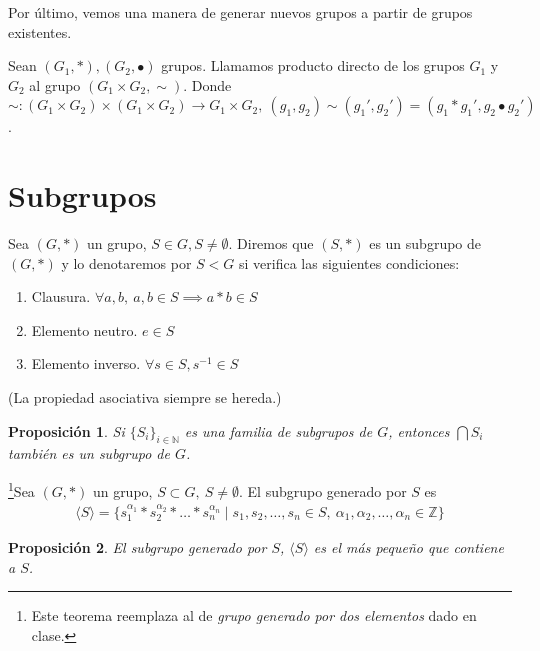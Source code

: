 \documentclass{book}
\newtheorem{pro}{Proposición}
\theoremstyle{definition}
\theoremstyle{remark}
\newcommand{\inv}[1]{#1^{-1}}
\newcommand{\Z}{\mathbb{Z}}
\begin{document}
Por último, vemos una manera de generar nuevos grupos a partir de grupos existentes.

\begin{dfn}
	Sean $(G_1, \ast), (G_2, \bullet)$ grupos. Llamamos producto directo de los grupos $G_1$ y $G_2$ al grupo $(G_1\times G_2, \sim)$. Donde $\sim : (G_1 \times G_2) \times (G_1 \times G_2) \to G_1 \times G_2,\ (g_1, g_2) \sim (g_1', g_2') = (g_1\ast g_1', g_2 \bullet g_2')$.
\end{dfn}

\section{Subgrupos}

\begin{dfn}[Subgrupo]
	Sea $(G, \ast)$ un grupo, $S \in G, S \neq \emptyset$. Diremos que $(S, \ast)$ es un subgrupo de $(G, \ast)$ y lo denotaremos por $S < G$ si verifica las siguientes condiciones:
	\begin{enumerate}
		\item Clausura. $\forall a, b,\ a,b \in S \implies a \ast b \in S$
		\item Elemento neutro. $e \in S$
		\item Elemento inverso. $\forall s \in S, \inv{s} \in S$ 
	\end{enumerate}
	(La propiedad asociativa siempre se hereda.)
\end{dfn}

\begin{pro}
	Si $\{S_i\}_{i \in \mathbb{N}}$ es una familia de subgrupos de $G$, entonces $\bigcap S_i$ también es un subgrupo de $G$.
\end{pro}



\begin{dfn}
	\footnote{Este teorema reemplaza al de \textit{grupo generado por dos elementos} dado en clase.}Sea $(G, \ast)$ un grupo, $S \subset G,\ S \neq \emptyset$. El subgrupo generado por $S$ es
	\begin{align}
	\langle S \rangle = \{s_1^{\alpha_1} \ast s_2^{\alpha_2} \ast \dots \ast s_n^{\alpha_n} \mid s_1, s_2, \dots, s_n \in S,\ \alpha_1, \alpha_2, \dots, \alpha_n \in \Z \}
	\end{align}
\end{dfn}

\begin{pro}
	El subgrupo generado por $S$, $\langle S \rangle$ es el más pequeño que contiene a $S$.
\end{pro}
\end{document}
